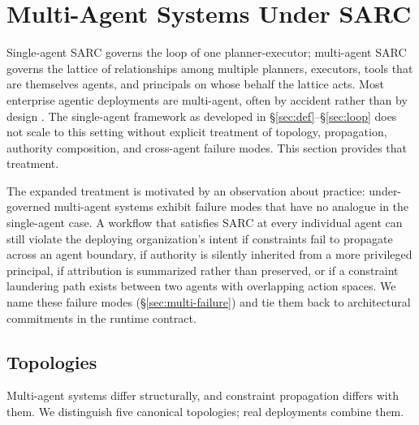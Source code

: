 \documentclass[11pt,a4paper]{article}
\theoremstyle{remark}
\begin{document}
\section{Multi-Agent Systems Under SARC}\label{sec:multi}

Single-agent SARC governs the loop of one planner-executor; multi-agent SARC governs the lattice of relationships among multiple planners, executors, tools that are themselves agents, and principals on whose behalf the lattice acts. Most enterprise agentic deployments are multi-agent, often by accident rather than by design \cite{wu2023autogen,park2023generative,hong2024metagpt,liu2024agentbench}. The single-agent framework as developed in \S\ref{sec:def}--\S\ref{sec:loop} does not scale to this setting without explicit treatment of topology, propagation, authority composition, and cross-agent failure modes. This section provides that treatment.

The expanded treatment is motivated by an observation about practice: under-governed multi-agent systems exhibit failure modes that have no analogue in the single-agent case. A workflow that satisfies SARC at every individual agent can still violate the deploying organization's intent if constraints fail to propagate across an agent boundary, if authority is silently inherited from a more privileged principal, if attribution is summarized rather than preserved, or if a constraint laundering path exists between two agents with overlapping action spaces. We name these failure modes (\S\ref{sec:multi-failure}) and tie them back to architectural commitments in the runtime contract.

\subsection{Topologies}\label{sec:multi-topo}

Multi-agent systems differ structurally, and constraint propagation differs with them. We distinguish five canonical topologies; real deployments combine them.
\end{document}
